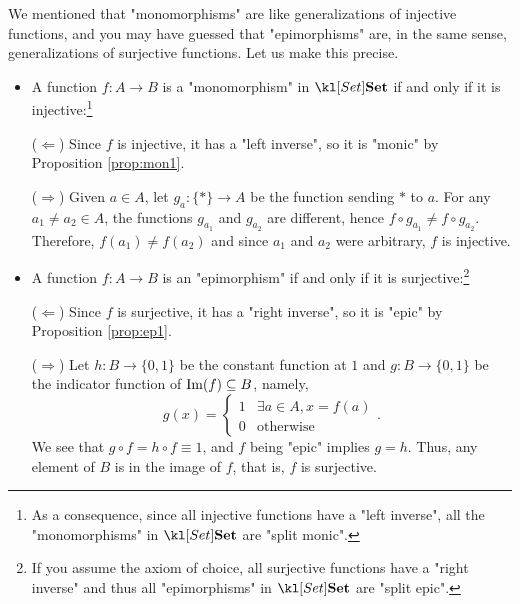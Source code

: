 \documentclass[main.tex]{subfiles}
\begin{document}
\begin{exmp}[$\catSet$]
	We mentioned that "monomorphisms" are like generalizations of injective functions, and you may have guessed that "epimorphisms" are, in the same sense, generalizations of surjective functions. Let us make this precise.
	\begin{itemize}
		\item A function $f:A\rightarrow B$ is a "monomorphism" in $\catSet$ if and only if it is injective:\footnote{As a consequence, since all injective functions have a "left inverse", all the "monomorphisms" in $\catSet$ are "split monic".}
		
		($\Leftarrow$) Since $f$ is injective, it has a "left inverse", so it is "monic" by Proposition \ref{prop:mon1}.
		
		($\Rightarrow$) Given $a \in A$, let $g_a: \{\ast\} \rightarrow A$ be the function sending $\ast$ to $a$. For any $a_1 \neq a_2 \in A$, the functions $g_{a_1}$ and $g_{a_2}$ are different, hence $f \circ g_{a_1} \neq f \circ g_{a_2}$. Therefore, $f(a_1) \neq f(a_2)$ and since $a_1$ and $a_2$ were arbitrary, $f$ is injective.
		
		\item A function $f:A\rightarrow B$ is an "epimorphism" if and only if it is surjective:\footnote{If you assume the axiom of choice, all surjective functions have a "right inverse" and thus all "epimorphisms" in $\catSet$ are "split epic".}
		
		($\Leftarrow$) Since $f$ is surjective, it has a "right inverse", so it is "epic" by Proposition \ref{prop:ep1}.
		
		($\Rightarrow$) Let $h: B \rightarrow \{0,1\}$ be the constant function at $1$ and $g:B \rightarrow \{0,1\}$ be the indicator function of $\operatorname{Im}(f) \subseteq B$, namely, \[g(x) = \begin{cases}1&\exists a \in A, x = f(a)\\0&\text{otherwise}\end{cases}.\]
		We see that $g \circ f = h\circ f \equiv 1$, and $f$ being "epic" implies $g = h$. Thus, any element of $B$ is in the image of $f$, that is, $f$ is surjective.
	\end{itemize}
\end{exmp}
\end{document}

